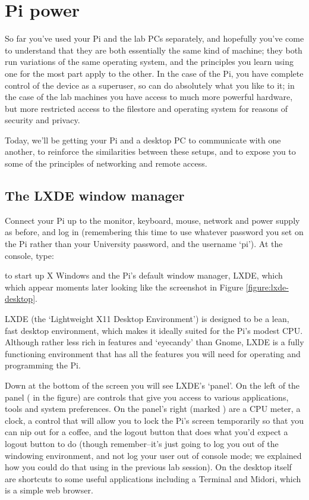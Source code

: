 \chapter{Pi power}
\minitoc
{}

So far you've used your Pi and the lab PCs separately, and hopefully you've come to understand that they are both essentially the same kind of machine; they both run variations of the same operating system, and the principles you learn using one for the most part apply to the other. In the case of the Pi, you have complete control of the device as a superuser, so can do absolutely what you like to it; in the case of the lab machines you have access to much more powerful hardware, but more restricted access to the filestore and operating system for reasons of security and privacy. 

Today, we'll be getting your Pi and a desktop PC to communicate with one another, to reinforce the similarities between these setups, and to expose you to some of the principles of networking and remote access. 

\section{The LXDE window manager}

Connect your Pi up to the monitor, keyboard, mouse, network and power supply as before, and log in (remembering this time to use whatever password you set on the Pi rather than your University password, and the username `pi'). At the console, type:


to start up X Windows and the Pi's default window manager, LXDE, which which appear moments later looking like the screenshot in Figure \ref{figure:lxde-desktop}. 

LXDE (the `Lightweight X11 Desktop Environment') is designed to be a lean, fast desktop environment, which makes it ideally suited for the Pi's modest CPU. Although rather less rich in features and `eyecandy' than Gnome, LXDE is a fully functioning environment that has all the features you will need for operating and programming the Pi. 

Down at the bottom of the screen you will see LXDE's `panel'. On the left of the panel (\protect{} in the figure) are controls that give you access to various applications, tools and system preferences. On the panel's right (marked \protect{}) are a CPU meter, a clock, a control that will allow you to lock the Pi's screen temporarily so that you can nip out for a coffee, and the logout button that does what you'd expect a logout button to do (though remember--it's just going to log you out of the windowing environment, and not log your user out of console mode; we explained how you could do that using  in the previous lab session). On the desktop itself are shortcuts to some useful applications including a Terminal and Midori, which is a simple web browser. 

